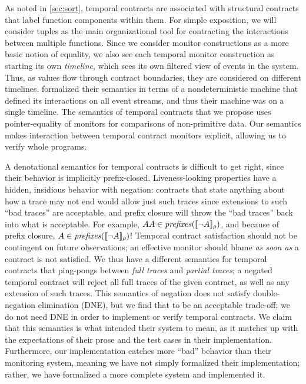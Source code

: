 %
As noted in \autoref{sec:sort}, temporal contracts are associated with structural contracts that label function components within them.
%
For simple exposition, we will consider tuples as the main organizational tool for contracting the interactions between multiple functions.
%
Since we consider monitor constructions as a more basic notion of equality, we also see each temporal monitor construction as starting its own \emph{timeline}, which sees its own filtered view of events in the system.
%
Thus, as values flow through contract boundaries, they are considered on different timelines.
%
\dfm formalized their semantics in terms of a nondeterministic machine that defined its interactions on all event streams, and thus their machine was on a single timeline.
%
The semantics of temporal contracts that we propose uses pointer-equality of monitors for comparisons of non-primitive data.
%
Our semantics makes interaction between temporal contract monitors explicit, allowing us to verify whole programs.

A denotational semantics for temporal contracts is difficult to get right, since their behavior is implicitly prefix-closed.
%
Liveness-looking properties have a hidden, insidious behavior with negation: contracts that state anything about how a trace may not end would allow just such traces since extensions to such ``bad traces'' are acceptable, and prefix closure will throw the ``bad traces'' back into what is acceptable.
%
For example, $AA \in \mathit{prefixes}([\![ \neg A ]\!]_{\rho})$, and because of prefix closure, $A \in \mathit{prefixes}([\![ \neg A ]\!]_{\rho})$!
%
Temporal contract satisfaction should not be contingent on future observations; an effective monitor should blame \emph{as soon as} a contract is not satisfied.
%
We thus have a different semantics for temporal contracts that ping-pongs between \emph{full traces} and \emph{partial traces}; a negated temporal contract will reject all full traces of the given contract, as well as any extension of such traces.
%
This semantics of negation does not satisfy double-negation elimination (DNE), but we find that to be an acceptable trade-off; we do not need DNE in order to implement or verify temporal contracts.
%
We claim that this semantics is what \dfm intended their system to mean, as it matches up with the expectations of their prose and the test cases in their implementation.
%
Furthermore, our implementation catches more ``bad'' behavior than their monitoring system, meaning we have not simply formalized their implementation; rather, we have formalized a more complete system and implemented it.

